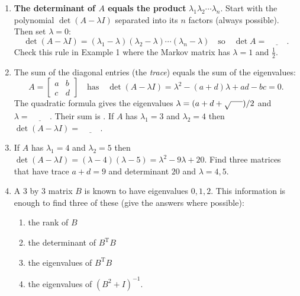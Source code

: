 \documentclass[14pt, a4paper]{article}
\begin{document}
\begin{enumerate}
    \item \textbf{The determinant of $A$ equals the product} $\lambda_1 \lambda_2 \cdots \lambda_n$. Start with the polynomial $\det(A - \lambda I)$ separated into its $n$ factors (always possible). Then set $\lambda = 0$:
          \[
              \det(A - \lambda I) = (\lambda_1 - \lambda)(\lambda_2 - \lambda) \cdots (\lambda_n - \lambda) \quad \text{so} \quad \det A = \underline{\hspace{1cm}} .
          \]
          Check this rule in Example 1 where the Markov matrix has $\lambda = 1$ and $\frac{1}{2}$.

    \item The sum of the diagonal entries (the \textit{trace}) equals the sum of the eigenvalues:
          \[
              A = \begin{bmatrix} a & b \\ c & d \end{bmatrix} \quad \text{has} \quad \det(A - \lambda I) = \lambda^2 - (a + d)\lambda + ad - bc = 0.
          \]
          The quadratic formula gives the eigenvalues $\lambda = (a + d + \sqrt{\hspace{0.5cm}})/2$ and $\lambda = \underline{\hspace{1cm}}$. Their sum is \underline{\hspace{1cm}}. If $A$ has $\lambda_1 = 3$ and $\lambda_2 = 4$ then $\det(A - \lambda I) = \underline{\hspace{1cm}}$.

    \item If $A$ has $\lambda_1 = 4$ and $\lambda_2 = 5$ then $\det(A - \lambda I) = (\lambda - 4)(\lambda - 5) = \lambda^2 - 9\lambda + 20$. Find three matrices that have trace $a + d = 9$ and determinant $20$ and $\lambda = 4, 5$.

    \item A 3 by 3 matrix $B$ is known to have eigenvalues $0, 1, 2$. This information is enough to find three of these (give the answers where possible):
          \begin{enumerate}
              \item the rank of $B$
              \item the determinant of $B^{\mathrm{T}}B$
              \item the eigenvalues of $B^{\mathrm{T}}B$
              \item the eigenvalues of $(B^2 + I)^{-1}$.
          \end{enumerate}


\end{enumerate}
\end{document}
